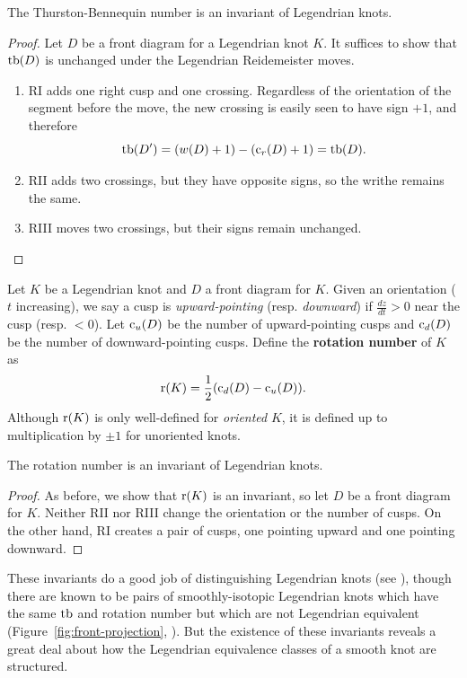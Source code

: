 \begin{proposition}
    The Thurston-Bennequin number is an invariant of Legendrian knots.
\end{proposition}
\begin{proof}
    Let $D$ be a front diagram for a Legendrian knot $K$. It suffices to show that $\operatorname{tb}(D)$ is unchanged under the Legendrian Reidemeister moves.

    \begin{enumerate}
        \item RI adds one right cusp and one crossing. Regardless of the orientation of the segment before the move, the new crossing is easily seen to have sign $+1$, and therefore
            \[
                \operatorname{tb}(D') = (w(D) + 1) - (\operatorname{c}_r(D) + 1) = \operatorname{tb}(D).
            \]
        \item RII adds two crossings, but they have opposite signs, so the writhe remains the same.
        \item RIII moves two crossings, but their signs remain unchanged.
    \end{enumerate}
    
\end{proof}

\begin{definition}
    Let $K$ be a Legendrian knot and $D$ a front diagram for $K$.
    Given an orientation ($t$ increasing), we say a cusp is \emph{upward-pointing} (resp. \emph{downward}) if $\frac{dz}{dt} > 0$ near the cusp (resp. $< 0$).
    Let $\operatorname{c}_u(D)$ be the number of upward-pointing cusps and $\operatorname{c}_d(D)$ be the number of downward-pointing cusps. Define the \textbf{rotation number} of $K$ as 
    \[
        \operatorname{r}(K) = \frac{1}{2} (\operatorname{c}_d(D) - \operatorname{c}_u(D)).
    \]
    Although $\operatorname{r}(K)$ is only well-defined for \emph{oriented} $K$, it is defined up to multiplication by $\pm 1$ for unoriented knots.
\end{definition}
\begin{proposition}
    The rotation number is an invariant of Legendrian knots.
\end{proposition}
\begin{proof}
    As before, we show that $\operatorname{r}(K)$ is an invariant, so let $D$ be a front diagram for $K$. Neither RII nor RIII change the orientation or the number of cusps. On the other hand, RI creates a pair of cusps, one pointing upward and one pointing downward.
\end{proof}

These invariants do a good job of distinguishing Legendrian knots (see \cite{eliashberg2008unknot}), though there are known to be pairs of smoothly-isotopic Legendrian knots which have the same $\operatorname{tb}$ and rotation number but which are not Legendrian equivalent (Figure~\ref{fig:front-projection}, \cite{chekanov}). But the existence of these invariants reveals a great deal about how the Legendrian equivalence classes of a smooth knot are structured. 

